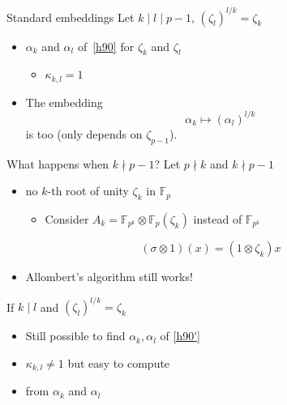\documentclass[xcolor=x11names,compress, aspectratio=43]{beamer}
\begin{document}
\begin{frame}{Standard embeddings}
  Let $k\mid l\mid p-1$, $(\zeta_l)^{l/k}=\zeta_k$
  \begin{itemize}
    \item $\alpha_k$ and $\alpha_l$  of~\eqref{h90} for
      $\zeta_k$ and $\zeta_l$
      \begin{itemize}
        \item<2-> $\kappa_{k, l} = 1$
      \end{itemize}
    \item<3-> The embedding
      \[
      \alpha_k\mapsto(\alpha_l)^{l/k}
    \]
    is  too (only depends on $\zeta_{p-1}$).
  \end{itemize}
\end{frame}

\begin{frame}{What happens when $k\nmid p-1$?}
  Let $p\nmid k$ and $k\nmid p-1$
  \begin{itemize}
    \item no $k$-th root of unity $\zeta_k$ in $\mathbb{F}_{p}$
      \begin{itemize}
        \item {} Consider
          $A_k=\mathbb{F}_{p^k}\otimes\mathbb{F}_{p}(\zeta_k)$ instead of
          $\mathbb{F}_{p^k}$
      \end{itemize}
\end{itemize}
      \begin{equation}
        \tag{H90'}
        (\sigma\otimes1)(x) = (1\otimes\zeta_k)x
        \label{h90'}
      \end{equation}
      \begin{itemize}
        \item Allombert's algorithm still works!
          \end{itemize}
          If $k\mid l$ and $(\zeta_l)^{l/k}=\zeta_k$
          \begin{itemize}
        \item Still possible to find  $\alpha_k,
          \alpha_l$ of \eqref{h90'}
        \item $\kappa_{k, l}\neq1$ but easy to compute
        \item {} from
              $\alpha_k$ and $\alpha_l$
      \end{itemize}
\end{frame}
\end{document}
